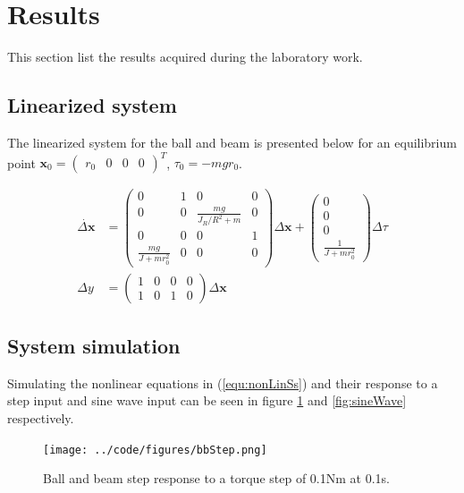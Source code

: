 \documentclass[a4paper, titlepage]{article}
\begin{document}
\section{Results}
This section list the results acquired during the laboratory work.

\subsection{Linearized system}
The linearized system for the ball and beam is presented below for an equilibrium point $\textbf{x}_0 = \begin{pmatrix} r_0 & 0 & 0 & 0 \end{pmatrix}^T$, $\tau_0 = -mgr_0$.

\begin{equation}
\begin{split}
\dot{\Delta\textbf{x}} &= 
\begin{pmatrix}
0 & 1 & 0 & 0 \\
0 & 0 & \frac{mg}{J_R/R^2 + m} & 0 \\
0 & 0 & 0 & 1 \\
\frac{mg}{J + mr_0^2} & 0 & 0 & 0
\end{pmatrix}\Delta\textbf{x} + \begin{pmatrix}
0 \\ 0 \\ 0 \\ \frac{1}{J + mr_0^2}
\end{pmatrix}\Delta\tau \\
\Delta y &= \begin{pmatrix}
1 & 0 & 0 & 0 \\
1 & 0 & 1 & 0
\end{pmatrix}\Delta\textbf{x}
\end{split}
\label{equ:linSys}
\end{equation}


\subsection{System simulation}
Simulating the nonlinear equations in (\ref{equ:nonLinSs}) and their response to a step input and sine wave input can be seen in figure \ref{fig:bbStep} and \ref{fig:sineWave} respectively.

\begin{figure}[H]
\center
\texttt{[image: ../code/figures/bbStep.png]}
\caption{Ball and beam step response to a torque step of 0.1Nm at 0.1s.}
\label{fig:bbStep}
\end{figure}
\end{document}
